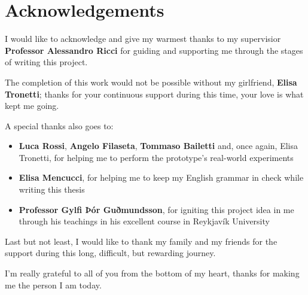 \chapter*{Acknowledgements}
 I would like to acknowledge and give my warmest thanks to my supervisior \textbf{Professor Alessandro Ricci} for guiding and supporting me through the stages of writing this project.\newline

 \noindent The completion of this work would not be possible without my girlfriend, \textbf{Elisa Tronetti}; thanks for your continuous support during this time, your love is what kept me going.\newline

 \noindent A special thanks also goes to:
 \begin{itemize}
    \item \textbf{Luca Rossi}, \textbf{Angelo Filaseta}, \textbf{Tommaso Bailetti} and, once again, Elisa Tronetti, for helping me to perform the prototype's real-world experiments
    \item \textbf{Elisa Mencucci}, for helping me to keep my English grammar in check while writing this thesis
    \item \textbf{Professor Gylfi Þór Guðmundsson}, for igniting this project idea in me through his teachings in his excellent course in Reykjavík University
 \end{itemize}

 \noindent Last but not least, I would like to thank my family and my friends for the support during this long, difficult, but rewarding journey.\newline
 
 \noindent I'm really grateful to all of you from the bottom of my heart, thanks for making me the person I am today.